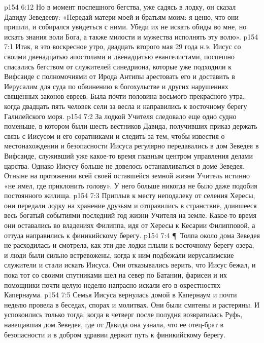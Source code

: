 \vs p154 6:12 Но в момент поспешного бегства, уже садясь в лодку, он сказал Давиду Зеведееву: «Передай матери моей и братьям моим: я ценю, что они пришли, и собирался увидеться с ними. Убеди их не искать обиды во мне, но искать знания воли Бога, а также милости и мужества исполнять эту волю».
\vs p154 7:1 Итак, в это воскресное утро, двадцать второго мая 29 года н.э. Иисус со своими двенадцатью апостолами и двенадцатью евангелистами, поспешно спасались бегством от служителей синедриона, которые уже подходили к Вифсаиде с полномочиями от Ирода Антипы арестовать его и доставить в Иерусалим для суда по обвинению в богохульстве и других нарушениях священных законов евреев. Была почти половина восьмого прекрасного утра, когда двадцать пять человек сели за весла и направились к восточному берегу Галилейского моря.
\vs p154 7:2 За лодкой Учителя следовало еще одно судно поменьше, в котором были шесть вестников Давида, получивших приказ держать связь с Иисусом и его соратниками и следить за тем, чтобы известия о местонахождении и безопасности Иисуса регулярно передавались в дом Зеведея в Вифсаиде, служивший уже какое\hyp{}то время главным центром управления делами царства. Однако Иисусу больше не довелось останавливаться в доме Зеведея. Отныне на протяжении всей своей оставшейся земной жизни Учитель истинно «не имел, где приклонить голову». У него больше никогда не было даже подобия постоянного жилища.
\vs p154 7:3 Приплыв к месту неподалеку от селения Хересы, они передали лодку на хранение друзьям и отправились в странствие, длившееся весь богатый событиями последний год жизни Учителя на земле. Какое\hyp{}то время они оставались во владениях Филиппа, идя от Хересы к Кесарии Филипповой, а оттуда направились к финикийскому берегу.
\vs p154 7:4 \P\ Толпа около дома Зеведея не расходилась и смотрела, как эти две лодки плыли к восточному берегу озера, и люди были сильно встревожены, когда к ним подбежали иерусалимские служители и стали искать Иисуса. Они отказывались верить, что Иисус бежал, и пока тот со своими спутниками шел на север по Батании, фарисеи и их помощники почти целую неделю напрасно искали его в окрестностях Капернаума.
\vs p154 7:5 Семья Иисуса вернулась домой в Капернаум и почти неделю провела в беседах, спорах и молитвах. Они были смятены и растеряны. И успокоились только тогда, когда в четверг после полудня возвратилась Руфь, навещавшая дом Зеведея, где от Давида она узнала, что ее отец\hyp{}брат в безопасности и в добром здравии держит путь к финикийскому берегу.
